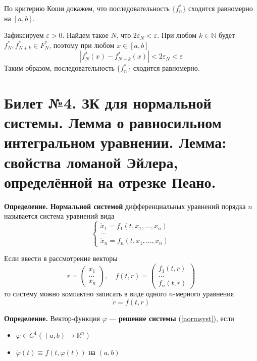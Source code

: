 \documentclass{article}
\begin{document}
По критерию Коши докажем, что последовательность $\{f_n^{*}\}$ сходится равномерно на $[a,b]$.

Зафиксируем $\varepsilon > 0$. Найдем такое $N$, что $2\varepsilon_N < \varepsilon$. При любом $k \in \mathbb{N}$ будет $f_N^*, f_{N+k}^* \in F_N^*$, поэтому при любом $x \in [a,b]$
\begin{equation*}
    |f_N^*(x) - f_{N + k}^*(x)| < 2\varepsilon_N < \varepsilon
\end{equation*}
Таким образом, последовательность $\{f_n^*\}$ сходится равномерно.

\section{Билет №4. ЗК для нормальной системы. Лемма о равносильном интегральном уравнении. Лемма: свойства ломаной Эйлера, определённой на отрезке Пеано.}
\textbf{Определение.} \textbf{Нормальной системой} дифференциальных уравнений порядка $n$ называется система уравнений вида
\begin{equation*}
    \begin{cases}
    \dot{x}_1 = f_1(t, x_1,...,x_n)\\
    ...\\
    \dot{x}_n = f_n(t, x_1, ..., x_n)
    \end{cases}
\end{equation*}

Если ввести в рассмотрение векторы
\begin{equation*}
    r = \begin{pmatrix}
    x_1\\
    ...\\
    x_n
    \end{pmatrix}, \quad
    f(t,r) = \begin{pmatrix}
        f_1(t,r)\\
        ...\\
        f_n(t,r)
    \end{pmatrix}
\end{equation*}
то систему можно компактно записать в виде одного $n$-мерного уравнения
\begin{equation}
    \dot{r} = f(t,r) \label{normsyst}
\end{equation}

\noindent \textbf{Определение.} Вектор-функция $\varphi$ --- \textbf{решение системы} (\ref{normsyst}), если
\begin{itemize}
    \item $\varphi \in C^1((a,b) \to \mathbb{R}^n)$
    \item $\dot{\varphi}(t) \equiv f(t, \varphi(t))$ на $(a,b)$
\end{itemize}
\end{document}
